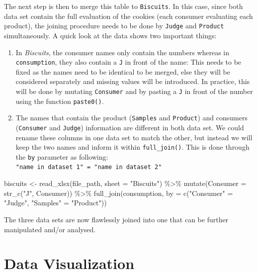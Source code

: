 \documentclass[
]{krantz}
\makeatletter
\newenvironment{Shaded}{\begin{snugshade}}{\end{snugshade}}
\newcommand{\AttributeTok}[1]{\textcolor[rgb]{0.61,0.61,0.61}{#1}}
\newcommand{\FunctionTok}[1]{\textcolor[rgb]{0,0,0}{#1}}
\newcommand{\NormalTok}[1]{#1}
\newcommand{\OtherTok}[1]{\textcolor[rgb]{0.37,0.37,0.37}{#1}}
\newcommand{\SpecialCharTok}[1]{\textcolor[rgb]{0,0,0}{#1}}
\newcommand{\StringTok}[1]{\textcolor[rgb]{0.5,0.5,0.5}{#1}}
\providecommand{\tightlist}{%
  \setlength{\itemsep}{0pt}\setlength{\parskip}{0pt}}
\newenvironment{kframe}{%
\medskip{}
\setlength{\fboxsep}{.8em}
 \def\at@end@of@kframe{}%
 \ifinner\ifhmode%
  \def\at@end@of@kframe{\end{minipage}}%
  \begin{minipage}{\columnwidth}%
 \fi\fi%
 \def\FrameCommand##1{\hskip\@totalleftmargin \hskip-\fboxsep
 \colorbox{shadecolor}{##1}\hskip-\fboxsep
     \hskip-\linewidth \hskip-\@totalleftmargin \hskip\columnwidth}%
 \MakeFramed {\advance\hsize-\width
   \@totalleftmargin\z@ \linewidth\hsize
   \@setminipage}}%
 {\par\unskip\endMakeFramed%
 \at@end@of@kframe}
\renewenvironment{Shaded}{\begin{kframe}}{\end{kframe}}
\makeatother
\begin{document}
The next step is then to merge this table to \texttt{Biscuits}. In this case, since both data set contain the full evaluation of the cookies (each consumer evaluating each product), the joining procedure needs to be done by \texttt{Judge} and \texttt{Product} simultaneously. A quick look at the data shows two important things:

\begin{enumerate}
\def\labelenumi{\arabic{enumi}.}
\tightlist
\item
  In \emph{Biscuits}, the consumer names only contain the numbers whereas in \texttt{consumption}, they also contain a \texttt{J} in front of the name: This needs to be fixed as the names need to be identical to be merged, else they will be considered separately and missing values will be introduced. In practice, this will be done by mutating \texttt{Consumer} and by pasting a \texttt{J} in front of the number using the function \texttt{paste0()}.
\item
  The names that contain the product (\texttt{Samples} and \texttt{Product}) and consumers (\texttt{Consumer} and \texttt{Judge}) information are different in both data set. We could rename these columns in one data set to match the other, but instead we will keep the two names and inform it within \texttt{full\_join()}. This is done through the \texttt{by} parameter as following: \texttt{"name\ in\ dataset\ 1"\ =\ "name\ in\ dataset\ 2"}
\end{enumerate}

\begin{Shaded}
\begin{Highlighting}[]
\NormalTok{biscuits }\OtherTok{\textless{}{-}} \FunctionTok{read\_xlsx}\NormalTok{(file\_path, }\AttributeTok{sheet =} \StringTok{"Biscuits"}\NormalTok{) }\SpecialCharTok{\%\textgreater{}\%}
   \FunctionTok{mutate}\NormalTok{(}\AttributeTok{Consumer =} \FunctionTok{str\_c}\NormalTok{(}\StringTok{"J"}\NormalTok{, Consumer)) }\SpecialCharTok{\%\textgreater{}\%}
   \FunctionTok{full\_join}\NormalTok{(consumption, }
             \AttributeTok{by =} \FunctionTok{c}\NormalTok{(}\StringTok{"Consumer"} \OtherTok{=} \StringTok{"Judge"}\NormalTok{, }\StringTok{"Samples"} \OtherTok{=} \StringTok{"Product"}\NormalTok{))}
\end{Highlighting}
\end{Shaded}

The three data sets are now flawlessly joined into one that can be further manipulated and/or analysed.

\hypertarget{data-viz}{%
\chapter{Data Visualization}\label{data-viz}}
\end{document}

